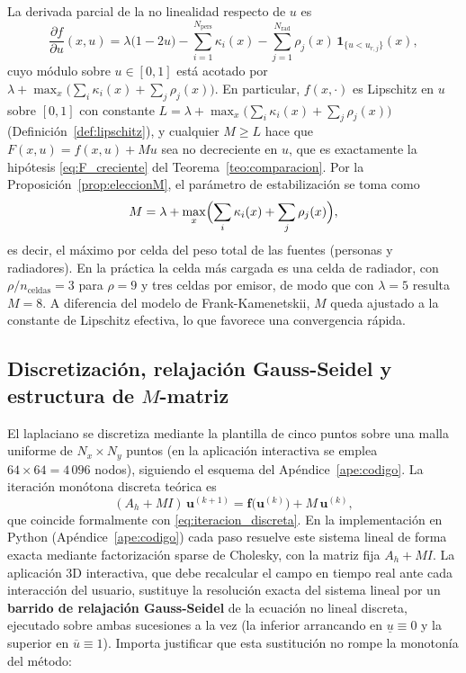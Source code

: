 \begin{itemize}
La derivada parcial de la no linealidad respecto de $u$ es
\begin{equation}\label{eq:piscina_derivada}
  \frac{\partial f}{\partial u}(x,u) = \lambda\bigl(1 - 2u\bigr)
  - \sum_{i=1}^{N_{\mathrm{pers}}} \kappa_i(x)
  - \sum_{j=1}^{N_{\mathrm{rad}}} \rho_j(x)\,
    \mathbf{1}_{\{u < u_{r,j}\}}(x),
\end{equation}
cuyo módulo sobre $u \in [0,1]$ está acotado por
$\lambda + \max_{x}\bigl(\sum_i \kappa_i(x) + \sum_j \rho_j(x)\bigr)$. En
particular, $f(x,\cdot)$ es Lipschitz en $u$ sobre $[0,1]$ con constante
$L = \lambda + \max_{x}\bigl(\sum_i \kappa_i(x) + \sum_j \rho_j(x)\bigr)$
(Definición~\ref{def:lipschitz}), y cualquier $M \geq L$ hace que
$F(x,u) = f(x,u) + M u$ sea no decreciente en $u$, que es exactamente la
hipótesis \eqref{eq:F_creciente} del Teorema~\ref{teo:comparacion}. Por la
Proposición~\ref{prop:eleccionM}, el parámetro de estabilización se toma como
\begin{equation}\label{eq:piscina_M}
  M = \lambda + \max_{x}\Bigl(\sum_i \kappa_i(x) + \sum_j \rho_j(x)\Bigr),
\end{equation}
es decir, el máximo por celda del peso total de las fuentes (personas y
radiadores). En la práctica la celda más cargada es una celda de radiador, con
$\rho/n_{\mathrm{celdas}} = 3$ para $\rho = 9$ y tres celdas por emisor, de modo
que con $\lambda = 5$ resulta $M = 8$. A diferencia del
modelo de Frank-Kamenetskii, $M$ queda ajustado a la constante de Lipschitz
efectiva, lo que favorece una convergencia rápida.

\subsection{Discretización, relajación Gauss-Seidel y estructura de $M$-matriz}

El laplaciano se discretiza mediante la plantilla de cinco puntos sobre una malla
uniforme de $N_x \times N_y$ puntos (en la aplicación interactiva se emplea
$64 \times 64 = 4\,096$ nodos), siguiendo el esquema del
Apéndice~\ref{ape:codigo}. La iteración monótona discreta teórica es
\begin{equation}\label{eq:piscina_iteracion}
  (A_h + M I)\,\mathbf{u}^{(k+1)}
  = \mathbf{f}\bigl(\mathbf{u}^{(k)}\bigr) + M\,\mathbf{u}^{(k)},
\end{equation}
que coincide formalmente con \eqref{eq:iteracion_discreta}. En la implementación
en Python (Apéndice~\ref{ape:codigo}) cada paso resuelve este sistema lineal de
forma exacta mediante factorización sparse de Cholesky, con la matriz fija
$A_h + M I$. La aplicación 3D interactiva, que debe recalcular el campo en
tiempo real ante cada interacción del usuario, sustituye la resolución exacta
del sistema lineal por un \textbf{barrido de relajación Gauss-Seidel} de la
ecuación no lineal discreta, ejecutado sobre ambas sucesiones a la vez (la
inferior arrancando en $\underline{u} \equiv 0$ y la superior en
$\overline{u} \equiv 1$). Importa justificar que esta sustitución no rompe la
monotonía del método:


\end{itemize}
